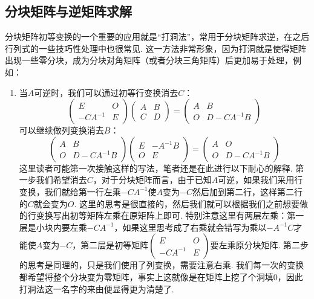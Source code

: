 \subsection{分块矩阵与逆矩阵求解}

分块矩阵初等变换的一个重要的应用就是``打洞法''，常用于分块矩阵求逆，在之后行列式的一些技巧性处理中也很常见. 这一方法非常形象，因为打洞就是使得矩阵出现一些零分块，成为分块对角矩阵（或者分块三角矩阵）后更加易于处理，例如：
\begin{enumerate}
    \item 当$A$可逆时，我们可以通过初等行变换消去$C$：
          \[ \begin{pmatrix}
                  E & O \\ -CA^{-1} & E
              \end{pmatrix}\begin{pmatrix}
                  A & B \\ C & D
              \end{pmatrix}=\begin{pmatrix}
                  A & B \\ O & D-CA^{-1}B
              \end{pmatrix} \]
          可以继续做列变换消去$B$：
          \[ \begin{pmatrix}
                  A & B \\ O & D-CA^{-1}B
              \end{pmatrix}\begin{pmatrix}
                  E & -A^{-1}B \\ O & E
              \end{pmatrix}=\begin{pmatrix}
                  A & O \\ O & D-CA^{-1}B
              \end{pmatrix} \]
          这里读者可能第一次接触这样的写法，笔者还是在此进行以下耐心的解释. 第一步我们希望消去$C$，对于分块矩阵而言，由于已知$A$可逆，如果我们采用行变换，我们就给第一行左乘$-CA^{-1}$使$A$变为$-C$然后加到第二行，这样第二行的$C$就会变为$O$. 这里的思考是很直接的，然后我们就可以根据我们之前想要做的行变换写出初等矩阵左乘在原矩阵上即可. 特别注意这里有两层左乘：第一层是小块内要左乘$-CA^{-1}$，如果这里思考成了右乘就会错写为乘以$-A^{-1}C$才能使$A$变为$-C$，第二层是初等矩阵$\begin{pmatrix}
                  E & O \\ -CA^{-1} & E
              \end{pmatrix}$要左乘原分块矩阵. 第二步的思考是同理的，只是我们使用了列变换，需要注意右乘. 我们每一次的变换都希望将整个分块变为零矩阵，事实上这就像是在矩阵上挖了个洞填0，因此打洞法这一名字的来由便显得更为清楚了.


\end{enumerate}
